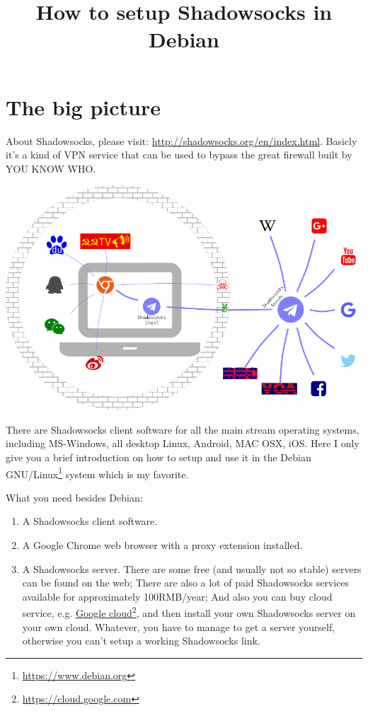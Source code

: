 \documentclass[12pt]{wx672article}
\title{How to setup Shadowsocks in Debian}
\begin{document}
\maketitle

\section{The big picture}

About Shadowsocks, please visit: \url{http://shadowsocks.org/en/index.html}. Basicly it's a kind
of VPN service that can be used to bypass the great firewall built by YOU KNOW WHO.

\begin{center}
\includegraphics[width=.8\linewidth]{./ss-img.pdf}
\end{center}

There are Shadowsocks client software for all the main stream operating systems, including
MS-Windows, all desktop Linux, Android, MAC OSX, iOS. Here I only give you a brief
introduction on how to setup and use it in the Debian GNU/Linux\footnote{\url{https://www.debian.org}} system which is my
favorite.

What you need besides Debian:
\begin{enumerate}
\item A Shadowsocks client software.
\item A Google Chrome web browser with a proxy extension installed.
\item A Shadowsocks server. There are some free (and usually not so stable) servers can be
found on the web; There are also a lot of paid Shadowsocks services available for
approximately 100RMB/year; And also you can buy cloud service, e.g. \href{https://cloud.google.com}{Google cloud}\footnote{\url{https://cloud.google.com}}, and
then install your own Shadowsocks server on your own cloud. Whatever, you have to
manage to get a server yourself, otherwise you can't setup a working Shadowsocks link.
\end{enumerate}
\end{document}

